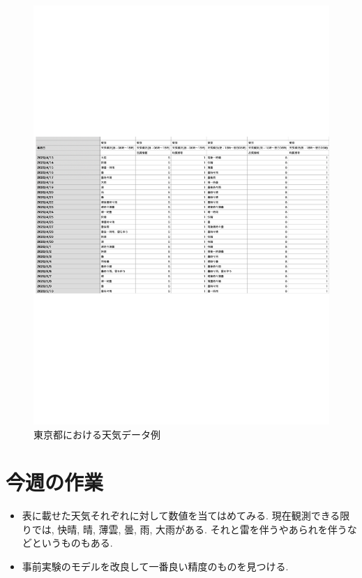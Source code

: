 \begin{figure}[phb]
\centering
\includegraphics[scale=0.8]{exe_wether.pdf}
\caption{東京都における天気データ例}
\end{figure}


\section{今週の作業}
\begin{itemize}
        \item 表に載せた天気それぞれに対して数値を当てはめてみる. 現在観測できる限りでは, 快晴, 晴, 薄雲, 曇, 雨, 大雨がある. それと雷を伴うやあられを伴うなどというものもある.
        \item 事前実験のモデルを改良して一番良い精度のものを見つける. 
\end{itemize}

